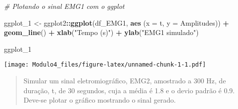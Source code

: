 \documentclass[
]{article}
\newenvironment{Shaded}{\begin{snugshade}}{\end{snugshade}}
\newcommand{\AttributeTok}[1]{\textcolor[rgb]{0.13,0.29,0.53}{#1}}
\newcommand{\CommentTok}[1]{\textcolor[rgb]{0.56,0.35,0.01}{\textit{#1}}}
\newcommand{\FunctionTok}[1]{\textcolor[rgb]{0.13,0.29,0.53}{\textbf{#1}}}
\newcommand{\NormalTok}[1]{#1}
\newcommand{\OtherTok}[1]{\textcolor[rgb]{0.56,0.35,0.01}{#1}}
\newcommand{\SpecialCharTok}[1]{\textcolor[rgb]{0.81,0.36,0.00}{\textbf{#1}}}
\newcommand{\StringTok}[1]{\textcolor[rgb]{0.31,0.60,0.02}{#1}}
\begin{document}
\begin{Shaded}
\begin{Highlighting}[]
\CommentTok{\# Plotando o sinal EMG1 com o ggplot}

\NormalTok{ggplot\_1 }\OtherTok{\textless{}{-}}\NormalTok{ ggplot2}\SpecialCharTok{::}\FunctionTok{ggplot}\NormalTok{(df\_EMG1, }\FunctionTok{aes}\NormalTok{ (}\AttributeTok{x =}\NormalTok{ t, }\AttributeTok{y =}\NormalTok{ Amplitudes)) }\SpecialCharTok{+}
  \FunctionTok{geom\_line}\NormalTok{() }\SpecialCharTok{+}
  \FunctionTok{xlab}\NormalTok{(}\StringTok{"Tempo (s)"}\NormalTok{) }\SpecialCharTok{+}
  \FunctionTok{ylab}\NormalTok{(}\StringTok{"EMG1 simulado"}\NormalTok{)}

\NormalTok{ggplot\_1}
\end{Highlighting}
\end{Shaded}

\texttt{[image: Modulo4\_files/figure-latex/unnamed-chunk-1-1.pdf]}

\begin{quote}
Simular um sinal eletromiográfico, EMG2, amostrado a 300 Hz, de duração,
t, de 30 segundos, cuja a média é 1.8 e o devio padrão é 0.9. Deve-se
plotar o gráfico mostrando o sinal gerado.
\end{quote}
\end{document}

